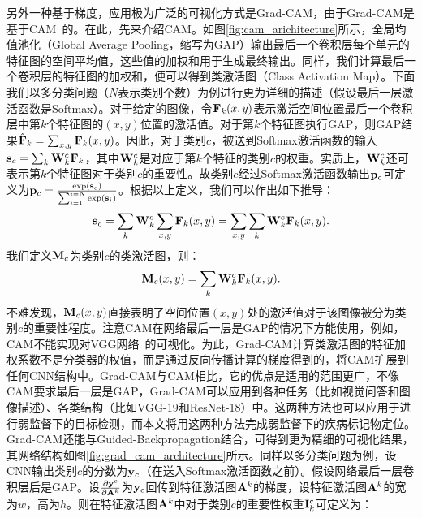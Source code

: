另外一种基于梯度，应用极为广泛的可视化方式是Grad-CAM，由于Grad-CAM是基于CAM~\cite{zhou2016learning}的。在此，先来介绍CAM。如图\ref{fig:cam_arichitecture}所示，全局均值池化（Global Average Pooling，缩写为GAP）输出最后一个卷积层每个单元的特征图的空间平均值，这些值的加权和用于生成最终输出。同样，我们计算最后一个卷积层的特征图的加权和，便可以得到类激活图（Class Activation Map）。下面我们以多分类问题（$N$表示类别个数）为例进行更为详细的描述（假设最后一层激活函数是Softmax）。对于给定的图像，令$\mathbf{F}_k(x, y)$表示激活空间位置最后一个卷积层中第$k$个特征图的$(x,y)$位置的激活值。对于第$k$个特征图执行GAP，则GAP结果$\hat{\mathbf{F}}_k=\sum_{x, y} \mathbf{F}_{k}(x,y)$。因此，对于类别$c$，被送到Softmax激活函数的输入$\mathbf{s}_c=\sum_{k} \mathbf{W}_{k}^{c} \mathbf{F}_{k}$，其中$\mathbf{W}_k^c$是对应于第$k$个特征的类别$c$的权重。实质上，$\mathbf{W}_{k}^{c}$还可表示第$k$个特征图对于类别$c$的重要性。故类别$c$经过Softmax激活函数输出${\mathbf{p}}_c$可定义为$\mathbf{p}_c=\frac{\exp \left(\mathbf{s}_{c}\right)}{\sum_{i=1}^{i=N} \exp \left(\mathbf{s}_{i}\right)}$。根据以上定义，我们可以作出如下推导：
\begin{equation}
\mathbf{s}_{c}=\sum_{k} \mathbf{W}_{k}^{c} \sum_{x, y} \mathbf{F}_{k}(x, y)=\sum_{x, y} \sum_{k} \mathbf{W}_{k}^{c} \mathbf{F}_{k}(x, y).
\end{equation}
我们定义$\mathbf{M}_c$为类别$c$的类激活图，则：
\begin{equation}\label{equ:cam_heatmap_compute}
\mathbf{M}_{c}(x, y)=\sum_{k} \mathbf{W}_{k}^{c} \mathbf{F}_{k}(x, y).
\end{equation}
不难发现，$\mathbf{M}_{c}(x, y)$直接表明了空间位置$(x,y)$处的激活值对于该图像被分为类别$c$的重要性程度。注意CAM在网络最后一层是GAP的情况下方能使用，例如，CAM不能实现对VGG网络~\cite{simonyan2014very}的可视化。为此，Grad-CAM计算类激活图的特征加权系数不是分类器的权值，而是通过反向传播计算的梯度得到的，将CAM扩展到任何CNN结构中。Grad-CAM与CAM相比，它的优点是适用的范围更广，不像CAM要求最后一层是GAP，Grad-CAM可以应用到各种任务（比如视觉问答和图像描述）、各类结构（比如VGG-19和ResNet-18）中。这两种方法也可以应用于进行弱监督下的目标检测，而本文将用这两种方法完成弱监督下的疾病标记物定位。Grad-CAM还能与Guided-Backpropagation结合，可得到更为精细的可视化结果，其网络结构如图\ref{fig:grad_cam_architecture}所示。同样以多分类问题为例，设CNN输出类别$c$的分数为$\mathbf{y}_c$（在送入Softmax激活函数之前）。假设网络最后一层卷积层后是GAP。设$\frac{\partial \mathbf{y}^{c}}{\partial \mathbf{A}^{k}}$为$\mathbf{y}_c$回传到特征激活图$\mathbf{A}^{k}$的梯度，设特征激活图$\mathbf{A}^{k}$的宽为$w$，高为$h$。则在特征激活图$\mathbf{A}^{k}$中对于类别$c$的重要性权重$\mathbf{I}_{k}^{c}$可定义为：
